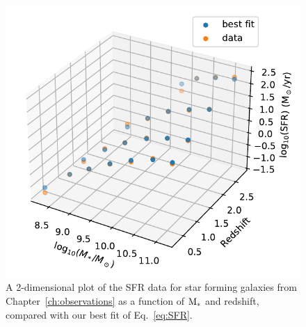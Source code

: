 \begin{figure}
\begin{center}
  \includegraphics[width=0.65\linewidth]{Figs/Chapter3/2D_SFR_fit_data.pdf}
  \caption{A 2-dimensional plot of the SFR data for star forming galaxies from Chapter~\ref{ch:observations} as a function of ${\rm M}_*$ and redshift, compared with our best fit of Eq.~\ref{eq:SFR}.
  }
    \label{fig:SFR_2D_fit}
\end{center}
\end{figure}
